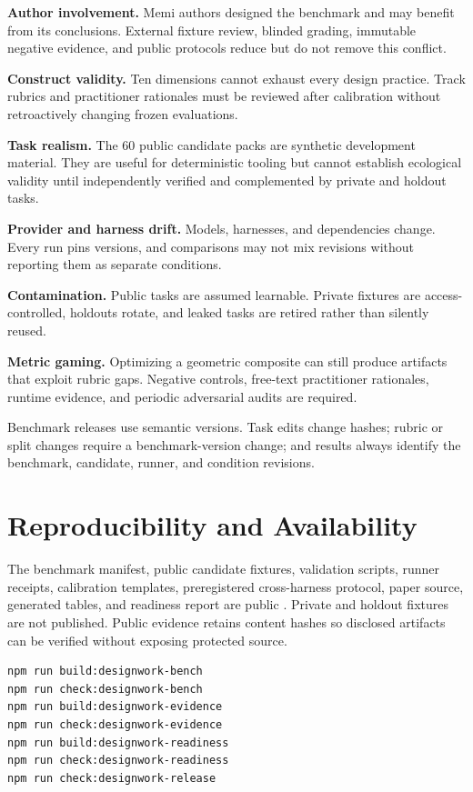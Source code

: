 \documentclass[10pt,twocolumn]{article}
\begin{document}
\textbf{Author involvement.} Memi authors designed the benchmark and may
benefit from its conclusions. External fixture review, blinded grading,
immutable negative evidence, and public protocols reduce but do not remove
this conflict.

\textbf{Construct validity.} Ten dimensions cannot exhaust every design
practice. Track rubrics and practitioner rationales must be reviewed after
calibration without retroactively changing frozen evaluations.

\textbf{Task realism.} The 60 public candidate packs are synthetic development
material. They are useful for deterministic tooling but cannot establish
ecological validity until independently verified and complemented by private
and holdout tasks.

\textbf{Provider and harness drift.} Models, harnesses, and dependencies
change. Every run pins versions, and comparisons may not mix revisions without
reporting them as separate conditions.

\textbf{Contamination.} Public tasks are assumed learnable. Private fixtures
are access-controlled, holdouts rotate, and leaked tasks are retired rather
than silently reused.

\textbf{Metric gaming.} Optimizing a geometric composite can still produce
artifacts that exploit rubric gaps. Negative controls, free-text practitioner
rationales, runtime evidence, and periodic adversarial audits are required.

Benchmark releases use semantic versions. Task edits change hashes; rubric or
split changes require a benchmark-version change; and results always identify
the benchmark, candidate, runner, and condition revisions.

\section{Reproducibility and Availability}

The benchmark manifest, public candidate fixtures, validation scripts,
runner receipts, calibration templates, preregistered cross-harness protocol,
paper source, generated tables, and readiness report are public
\cite{memibench2026,memireadiness2026}. Private and holdout fixtures are not
published. Public evidence retains content hashes so disclosed artifacts can
be verified without exposing protected source.

\begin{lstlisting}
npm run build:designwork-bench
npm run check:designwork-bench
npm run build:designwork-evidence
npm run check:designwork-evidence
npm run build:designwork-readiness
npm run check:designwork-readiness
npm run check:designwork-release
\end{lstlisting}
\end{document}
